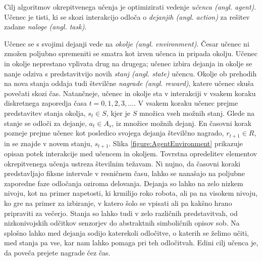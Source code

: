 \documentclass[a4paper, oneside, 12pt]{report}
\begin{document}
Cilj algoritmov okrepitvenega učenja je optimizirati vedenje {\em učenca (angl. agent)}. Učenec je tisti, ki se skozi interakcijo odloča o {\em dejanjih (angl. action)} za rešitev zadane {\em naloge (angl. task)}.

Učenec se s svojimi dejanji vede na {\em okolje (angl. environment)}. Česar učenec ni zmožen poljubno spremeniti se smatra kot izven učenca in pripada okolju. Učenec in okolje neprestano vplivata drug na drugega; učenec izbira dejanja in okolje se nanje odziva s predstavitvijo novih {\em stanj (angl. state)} učencu. Okolje ob prehodih na nova stanja oddaja tudi številčne {\em nagrade (angl. reward)}, katere učenec skuša povečati skozi čas. Natančneje, učenec in okolje sta v interakciji v vsakem koraku diskretnega zaporedja časa $t = 0, 1, 2, 3, \dots$. V vsakem koraku učenec prejme predstavitev stanja okolja, $s_t \in S$, kjer je $S$ množica vseh možnih stanj. Glede na stanje se odloči za dejanje, $a_t \in A_s$, iz množice možnih dejanj. En časovni korak pozneje prejme učenec kot posledico svojega dejanja številčno nagrado, $r_{t+1} \in R$, in se znajde v novem stanju, $s_{t+1}$. Slika \ref{figure:AgentEnvironment} prikazuje opisan potek interakcije med učencem in okoljem. Tovrstna opredelitev elementov okrepitvenega učenja ustreza številnim težavam. Ni nujno, da časovni koraki predstavljajo fiksne intervale v resničnem času, lahko se nanašajo na poljubne zaporedne faze odločanja oziroma delovanja. Dejanja so lahko na zelo nizkem nivoju, kot na primer napetosti, ki krmilijo roko robota, ali pa na visokem nivoju, ko gre na primer za izbiranje, v katero šolo se vpisati ali pa kakšno hrano pripraviti za večerjo. Stanja so lahko tudi v zelo različnih predstavitvah, od nizkonivojskih odčitkov senzorjev do abstraktnih simboličnih opisov sob. Na splošno lahko med dejanja sodijo katerekoli odločitve, o katerih se želimo učiti, med stanja pa vse, kar nam lahko pomaga pri teh odločitvah. Edini cilj učenca je, da poveča prejete nagrade čez čas.
\end{document}
